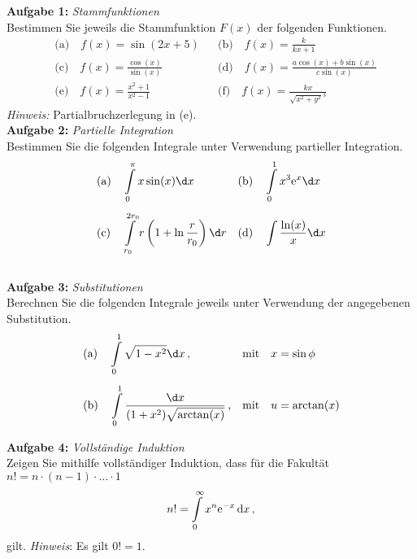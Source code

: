 
\textbf{Aufgabe 1: } \emph{Stammfunktionen}\\[0.2cm]
Bestimmen Sie jeweils die Stammfunktion $F(x)$ der folgenden Funktionen.
\begin{align*}
&\text{(a)}\quad f(x)=\sin(2x+5)					&& \text{(b)}\quad f(x)=\frac{k}{kx+1}\\[1ex]
&\text{(c)}\quad f(x)=\frac{\cos(x)}{\sin(x)}		&& \text{(d)}\quad f(x)=\frac{a\cos(x)+b\sin(x)}{c\sin(x)}\\[1ex]
&\text{(e)}\quad f(x)=\frac{x^2+1}{x^2-1}			&& \text{(f)}\quad f(x)=\frac{kx}{\sqrt{x^2+y^2}^3}
\end{align*}
\emph{Hinweis:} Partialbruchzerlegung in (e).\\[1cm]
%
\textbf{Aufgabe 2: } \emph{Partielle Integration}\\[0.2cm]
Bestimmen Sie die folgenden Integrale unter Verwendung partieller Integration.
\begin{align*}
&\text{(a)}\quad \int\limits_0^\pi x\sin(x)\d x			&& \text{(b)}\quad \int\limits_0^1 x^3\e^{x}\d x\\[1ex]
&\text{(c)}\quad \int\limits_{r_0}^{2r_0} r\left(1+\ln\frac{r}{r_0}\right)\d r	&& \text{(d)}\quad \int\frac{\ln(x)}{x}\d x
\end{align*}\\[0.8cm]
%
\textbf{Aufgabe 3: } \emph{Substitutionen}\\[0.2cm]
Berechnen Sie die folgenden Integrale jeweils unter Verwendung der angegebenen Substitution.
\begin{align*}
&\text{(a)}\quad \int\limits_0^1 \sqrt{1-x^2}\d x\,,		&&\text{mit}\quad x=\sin\phi\\[1ex]
&\text{(b)}\quad \int\limits_0^1 \frac{\d x}{(1+x^2)\sqrt{\arctan(x)}}	\,,	&&\text{mit}\quad u=\arctan(x)
\end{align*}
%

\newpage\noindent
\textbf{Aufgabe 4: } \emph{Vollständige Induktion}\\[0.2cm]
Zeigen Sie mithilfe vollständiger Induktion, dass für die Fakultät $n! = n\cdot (n-1) \cdot \hdots \cdot 1$
\begin{align*}
        n! = \int\limits_{0}^{\infty} x^n \mathrm{e}^{-x} \dd{x},
\end{align*}
gilt. \emph{Hinweis}: Es gilt $0! = 1$.

